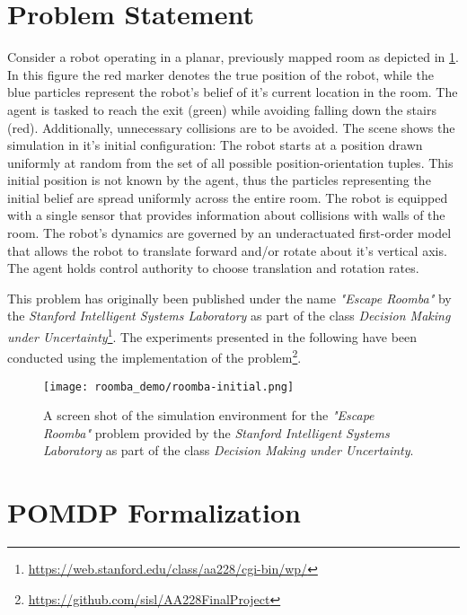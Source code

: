\section{Problem Statement}\label{sec:lp-problem-statement}

Consider a robot operating in a planar, previously mapped room as depicted in
\cref{fig:roomba-env}. In this figure the red marker denotes the true position
of the robot, while the blue particles represent the robot's belief of it's
current location in the room. The agent is tasked to reach the exit (green)
while avoiding falling down the stairs (red). Additionally, unnecessary
collisions are to be avoided. The scene shows the simulation in it's initial
configuration: The robot starts at a position drawn uniformly at random from
the set of all possible position-orientation tuples. This initial position is
not known by the agent, thus the particles representing the initial belief are
spread uniformly across the entire room. The robot is equipped with a single
sensor that provides information about collisions with walls of the room. The
robot's dynamics are governed by an underactuated first-order model that allows
the robot to translate forward and/or rotate about it's vertical axis. The
agent holds control authority to choose translation and rotation rates.

This problem has originally been published under the name \emph{"Escape
Roomba"} by the \emph{Stanford Intelligent Systems Laboratory} as part of the
class \emph{Decision Making under
Uncertainty}\footnote{\url{https://web.stanford.edu/class/aa228/cgi-bin/wp/}}.
The experiments presented in the following have been conducted using the
\pomdpsjl implementation of the
problem\footnote{\url{https://github.com/sisl/AA228FinalProject}}.

\begin{figure}[htpb]
  \centering
  \texttt{[image: roomba\_demo/roomba-initial.png]}
  \caption{A screen shot of the simulation environment for the \emph{"Escape
  Roomba"} problem provided by the \emph{Stanford Intelligent Systems
  Laboratory} as part of the class \emph{Decision Making under Uncertainty}.}
  \label{fig:roomba-env}
\end{figure}

\clearpage
\section{POMDP Formalization}\label{sec:lp-pomdp-formalization}

